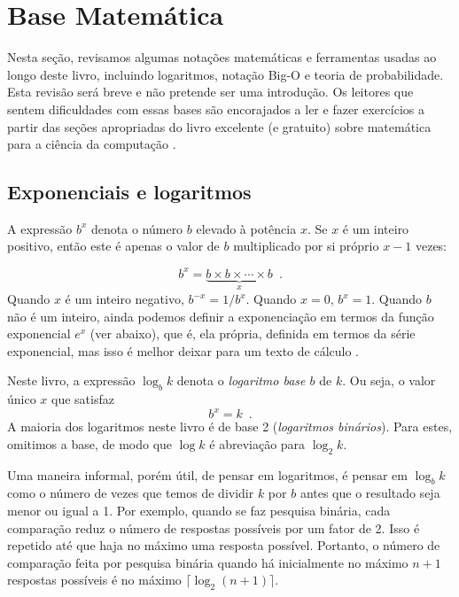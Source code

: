 
\section{Base Matemática}

Nesta seção, revisamos algumas notações matemáticas e ferramentas usadas ao
longo deste livro, incluindo logaritmos, notação Big-O e teoria de
probabilidade. Esta revisão será breve e não pretende ser uma introdução. Os
leitores que sentem dificuldades com essas bases são encorajados a ler e fazer
exercícios a partir das seções apropriadas do livro excelente (e gratuito) sobre
matemática para a ciência da computação \cite{llm11}.

\subsection{Exponenciais e logaritmos}

%
A expressão $b^x$ denota o número $b$ elevado à potência $x$. 
Se $x$ é um inteiro positivo, então este é apenas o valor de $b$ 
multiplicado por si próprio $x-1$ vezes:

\[
b^x = \underbrace{b\times b\times \cdots \times b}_{x} \enspace .
\]
Quando $x$ é um inteiro negativo, $b^{-x}=1/b^{x}$. Quando  $x=0$, $b^x=1$. 
Quando $b$ não é um inteiro, ainda podemos definir a exponenciação em termos 
da função exponencial $e^x$ (ver abaixo), que é, ela própria, definida em 
termos da série exponencial, mas isso é melhor deixar para um texto de cálculo .

%
Neste livro, a expressão $\log_b k $ denota o \emph{logaritmo base $b$} 
de $k$. Ou seja, o valor único $x$ que satisfaz
\[
b^{x} = k  \enspace .
\]
A maioria dos logaritmos neste livro é de base 2 (\emph{logaritmos binários}).
%
%
Para estes, omitimos a base, de modo que $\log k$ é abreviação para $\log_2 k$.

Uma maneira informal, porém útil, de pensar em logaritmos, é pensar 
em $\log_b k$ como o número de vezes que temos de dividir $k$ por $b$ 
antes que o resultado seja menor ou igual a 1. Por exemplo, 
quando se faz pesquisa binária, cada comparação reduz o número 
de respostas possíveis por um fator de 2. Isso é repetido até que haja no máximo
uma resposta possível. Portanto, o número de comparação feita por pesquisa
binária quando há inicialmente no máximo $n+1$ respostas possíveis é no máximo
$\lceil\log_2(n+1)\rceil$.

